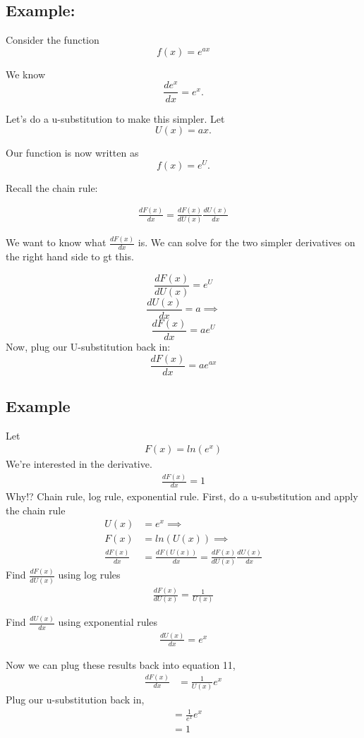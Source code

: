 \documentclass{article}
\begin{document}
\subsection{Example:}
Consider the function \[f(x) = e^{ax}\]

We know \[\frac{de^x}{dx} = e^x.\] 

Let's do a u-substitution to make this simpler. Let \[U(x) = ax.\]  

Our function is now written as \[f(x) = e^U.\] 

Recall the chain rule:

\begin{align}
   \frac{dF(x)}{dx} = \frac{dF(x)}{dU(x)}\frac{dU(x)}{dx} 
\end{align}

We want to know what $\frac{dF(x)}{dx}$ is. We can solve for the two simpler derivatives on the right hand side to gt this. 

\[\frac{dF(x)}{dU(x)} = e^U \]
\[\frac{dU(x)}{dx}  = a \implies\]
\[\frac{dF(x)}{dx} = a e^U \]
Now, plug our U-substitution back in: 
\[\frac{dF(x)}{dx} = a e^{ax} \]

\subsection{Example}
Let 
\begin{align}
    F(x) = ln(e^x)
\end{align}
We're interested in the derivative. 
\begin{align}
    \frac{dF(x)}{dx} = 1
\end{align}
Why!? Chain rule, log rule, exponential rule. First, do a u-substitution and apply the chain rule
\begin{align}
    U(x) &= e^x \implies\\
    F(x) &= ln(U(x)) \implies \\
    \frac{dF(x)}{dx} &= \frac{dF(U(x))}{dx} = \frac{dF(x)}{dU(x)}\frac{dU(x)}{dx}
\end{align}
Find $\frac{dF(x)}{dU(x)}$ using log rules 
\begin{align}
    \frac{dF(x)}{dU(x)} = \frac{1}{U(x)}
\end{align}

Find $\frac{dU(x)}{dx}$ using exponential rules 
\begin{align}
    \frac{dU(x)}{dx} = e^x
\end{align}

Now we can plug these results back into equation 11, 
\begin{align}
    \frac{dF(x)}{dx} &= \frac{1}{U(x)} e^x
\end{align}
Plug our u-substitution back in, 
\begin{align}
    &= \frac{1}{e^x} e^x \\
    &= 1
\end{align}
\end{document}
